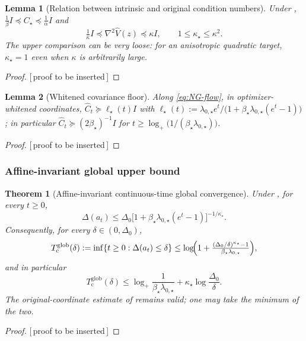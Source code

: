 \documentclass[11pt]{article}
\theoremstyle{plain}
\newtheorem{theorem}{Theorem}[section]
\newtheorem{lemma}[lemma]{Lemma}
\theoremstyle{definition}
\theoremstyle{remark}
\newcommand{\Id}{I}
\newcommand{\logp}{\log_+}
\newcommand{\glob}{\mathrm{glob}}
\newcommand{\PROOFHOLE}{{\color{red}\textsf{[\,proof to be inserted\,]}}}
\newcommand{\betastar}{\beta_\star}
\newcommand{\kappastar}{\kappa_\star}
\begin{document}
\begin{lemma}[Relation between intrinsic and original condition numbers]
\label{lem:kappa-star-kappa}
Under , $\tfrac1\beta\Id\preceq C_\star\preceq\tfrac1\alpha\Id$ and
\begin{equation}
\label{eq:kappa-star-kappa}
    \tfrac1\kappa\Id\preceq\nabla^2\widehat V(z)\preceq\kappa\Id,\qquad 1\leq\kappastar\leq\kappa^2.
\end{equation}
The upper comparison can be very loose: for an anisotropic quadratic target, $\kappastar=1$ even when
$\kappa$ is arbitrarily large.
\end{lemma}
\begin{proof}
\PROOFHOLE
\end{proof}

\begin{lemma}[Whitened covariance floor]
\label{lem:cont-cov-star}
Along \eqref{eq:NG-flow}, in optimizer-whitened coordinates,
$\widehat C_t\succeq\ell_\star(t)\Id$ with
$\ell_\star(t):=\lambda_{0,\star}e^t/\bigl(1+\betastar\lambda_{0,\star}(e^t-1)\bigr)$; in particular
$\widehat C_t\succeq(2\betastar)^{-1}\Id$ for $t\geq\logp\bigl(1/(\betastar\lambda_{0,\star})\bigr)$.
\end{lemma}
\begin{proof}
\PROOFHOLE
\end{proof}

\subsubsection{Affine-invariant global upper bound}

\begin{theorem}[Affine-invariant continuous-time global convergence]
\label{thm:cont-global-star}
Under , for every $t\geq0$,
\begin{equation}
\label{eq:cont-star-decay}
    \boxed{\Delta(a_t)\leq\Delta_0\bigl[1+\betastar\lambda_{0,\star}(e^t-1)\bigr]^{-1/\kappastar}.}
\end{equation}
Consequently, for every $\delta\in(0,\Delta_0)$,
\begin{equation}
\label{eq:cont-star-hitting-exact}
    T_{\mathrm c}^{\glob}(\delta):=\inf\{t\geq0:\Delta(a_t)\leq\delta\}
    \leq\log\!\Bigl(1+\tfrac{(\Delta_0/\delta)^{\kappastar}-1}{\betastar\lambda_{0,\star}}\Bigr),
\end{equation}
and in particular
\begin{equation}
\label{eq:cont-star-hitting-simple}
    \boxed{T_{\mathrm c}^{\glob}(\delta)\leq\logp\frac1{\betastar\lambda_{0,\star}}
    +\kappastar\log\frac{\Delta_0}{\delta}.}
\end{equation}
The original-coordinate estimate of  remains valid; one may take the minimum of
the two.
\end{theorem}
\begin{proof}
\PROOFHOLE
\end{proof}
\end{document}
